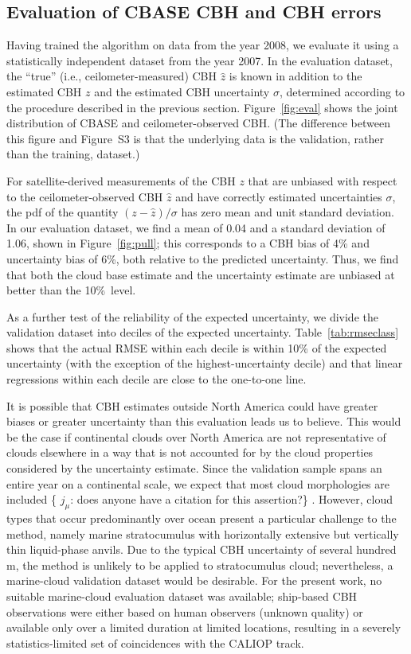 \documentclass[essd,manuscript]{copernicus}\usepackage[]{graphicx}\usepackage[]{color}
\newcommand{\hlnum}[1]{\textcolor[rgb]{0.686,0.059,0.569}{#1}}%
\newcommand\comment[2]{\{\hlnum{ \textit{#1}: #2}\}}
\newcommand\commentjm[1]{\comment{$j_\mu$}{#1}}
\begin{document}
\subsection{Evaluation of CBASE CBH and CBH errors}
\label{sec:algorithm:eval}

Having trained the algorithm on data from the year 2008, we evaluate it using a
statistically independent dataset from the year 2007.  In the evaluation
dataset, the ``true'' (i.e., ceilometer-measured) CBH $\hat{z}$ is known in
addition to the estimated CBH $z$ and the estimated CBH uncertainty $\sigma$,
determined according to the procedure described in the previous section.
Figure~\ref{fig:eval} shows the joint distribution of CBASE and
ceilometer-observed CBH.  (The difference between this figure and Figure~S3 is
that the underlying data is the validation, rather than the training, dataset.)

For satellite-derived measurements of the CBH $z$ that are unbiased with respect
to the ceilometer-observed CBH $\hat{z}$ and have correctly estimated
uncertainties $\sigma$, the pdf of the quantity $(z - \hat{z})/\sigma$ has zero
mean and unit standard deviation. In our evaluation dataset, we find a mean of
0.04 and a standard
deviation of 1.06, shown in
Figure~\ref{fig:pull}; this corresponds to a CBH bias of %
4\% and
uncertainty bias of %
6\%,
both relative to the predicted uncertainty.  Thus, we find that both the cloud
base estimate and the uncertainty estimate are unbiased at better than the 10\%\
level.

As a further test of the reliability of the expected uncertainty, we divide the
validation dataset into deciles of the expected uncertainty.
Table~\ref{tab:rmseclass} shows that the actual RMSE within each decile is
within 10\% of the expected uncertainty (with the exception of the highest-uncertainty
decile) and that linear regressions within each
decile are close to the one-to-one line.

It is possible that CBH estimates outside North America could have greater
biases or greater uncertainty than this evaluation leads us to believe.  This
would be the case if continental clouds over North America are not
representative of clouds elsewhere in a way that is not accounted for by the
cloud properties considered by the uncertainty estimate.  Since the validation
sample spans an entire year on a continental scale, we expect that most cloud
morphologies are included \commentjm{does anyone have a citation for this
  assertion?} .  However, cloud types that occur predominantly over ocean
present a particular challenge to the method, namely marine stratocumulus with
horizontally extensive but vertically thin liquid-phase anvils.  Due to the
typical CBH uncertainty of several hundred m, the method is unlikely to be
applied to stratocumulus cloud; nevertheless, a marine-cloud validation dataset
would be desirable.  For the present work, no suitable marine-cloud evaluation
dataset was available; ship-based CBH observations were either based on human
observers (unknown quality) or available only over a limited duration at limited
locations, resulting in a severely statistics-limited set of coincidences with
the CALIOP track.
\end{document}
